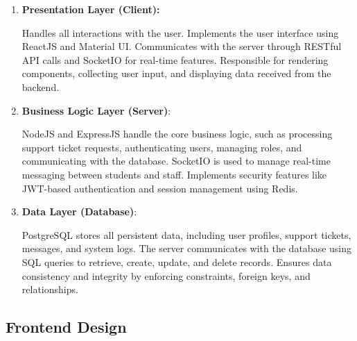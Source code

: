 \begin{enumerate}
	\item \textbf{Presentation Layer (Client):}
	
	Handles all interactions with the user.
	Implements the user interface using ReactJS and Material UI.
	Communicates with the server through RESTful API calls and SocketIO for real-time features.
	Responsible for rendering components, collecting user input, and displaying data received from the backend.
	
	\item \textbf{Business Logic Layer (Server)}:
	
	NodeJS and ExpressJS handle the core business logic, such as processing support ticket requests, authenticating users, managing roles, and communicating with the database.
	SocketIO is used to manage real-time messaging between students and staff.
	Implements security features like JWT-based authentication and session management using Redis.
	
	\item \textbf{ Data Layer (Database)}:
	
	PostgreSQL stores all persistent data, including user profiles, support tickets, messages, and system logs.
	The server communicates with the database using SQL queries to retrieve, create, update, and delete records.
	Ensures data consistency and integrity by enforcing constraints, foreign keys, and relationships.
	
\end{enumerate}


\subsection{Frontend Design}












%	
	


	